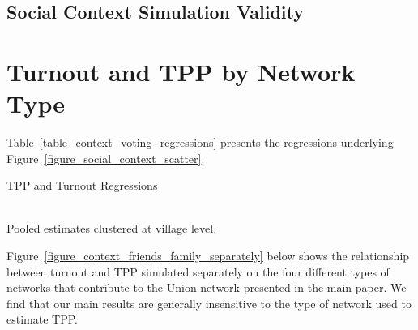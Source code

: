 \documentclass[12pt]{article}
\begin{document}
\begin{appendix}
\pagebreak
\begin{landscape}
    \section{Social Context Simulation Validity}\label{appendix_socialcontext_validity}


\end{landscape}
\pagebreak
\begin{landscape}
    
    
\end{landscape}
\pagebreak
\begin{landscape}
    
\end{landscape}
\pagebreak

\section{Turnout and TPP by Network Type}\label{appendix_core_result_by_network_type}

Table~\ref{table_context_voting_regressions} presents the regressions underlying Figure~\ref{figure_social_context_scatter}.

\begin{table}
	\caption{TPP and Turnout Regressions}\label{table_context_voting_regressions}
	 \\
	Pooled estimates clustered at village level.
\end{table}

Figure~\ref{figure_context_friends_family_separately} below shows the relationship between turnout and TPP simulated separately on the four different types of networks that contribute to the Union network presented in the main paper. We find that our main results are generally insensitive to the type of network used to estimate TPP.



\end{appendix}
\end{document}
